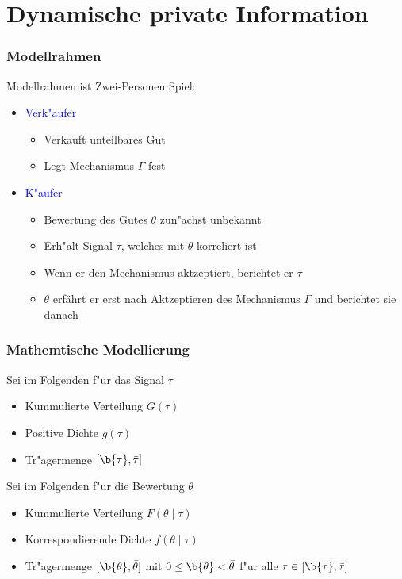 \section{Dynamische private Information}
\begin{frame}
  \frametitle{Modellrahmen}
  \justifying
  Modellrahmen ist Zwei-Personen Spiel:
  \begin{itemize}
    \item \textcolor{blue}{Verk"aufer}
    \begin{itemize}
      \item Verkauft unteilbares Gut
      \item Legt Mechanismus $\Gamma$ fest
    \end{itemize}
    \item \textcolor{blue}{K"aufer}
    \begin{itemize}
      \item Bewertung des Gutes $\theta$ zun"achst unbekannt
      \item Erh"alt Signal $\tau$, welches mit $\theta$ korreliert ist
      \item Wenn er den Mechanismus aktzeptiert, berichtet er $\tau$
      \item $\theta$ erf\"ahrt er erst nach Aktzeptieren des Mechanismus $\Gamma$ und berichtet sie danach
    \end{itemize}
  \end{itemize}
\end{frame}

\begin{frame}
  \frametitle{Mathemtische Modellierung}
  \justifying
  Sei im Folgenden f"ur das Signal $\tau$
  \begin{itemize}
    \item Kummulierte Verteilung $G(\tau)$
    \item Positive Dichte $g(\tau)$
    \item Tr"agermenge $[ \b{\tau} , \bar{\tau} ]$
  \end{itemize}
  Sei im Folgenden f"ur die Bewertung $\theta$
  \begin{itemize}
    \item Kummulierte Verteilung $F(\theta \mid \tau)$
    \item Korrespondierende Dichte $f(\theta \mid \tau)$
    \item Tr"agermenge $[ \b{\theta} , \bar{\theta} ]$ mit $0 \leq \b{\theta} < \bar{\theta} $ f"ur alle $\tau \in [ \b{\tau} , \bar{\tau} ]$
  \end{itemize}
\end{frame}

